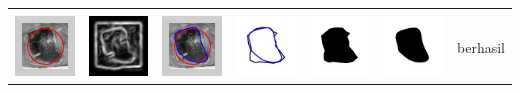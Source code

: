 \begin{table}[H]
\begin{tabular}{|m{0.7in}|m{0.7in}|m{0.7in}|m{0.7in}|m{0.7in}|m{0.7in}|m{0.7in}|}
		&  &  & & & &  \\
		\includegraphics[width=0.7in]{dataset/dataset_3/luka_hitam/ready/18_interp_init.jpg}&
		\includegraphics[width=0.7in]{dataset/dataset_3/luka_hitam/ready/18_interp_ext.jpg}&
		\includegraphics[width=0.7in]{dataset/dataset_3/luka_hitam/ready/18_interp_result.jpg}&
		\includegraphics[width=0.7in]{dataset/dataset_3/luka_hitam/ready/18_gt_r.jpg}&
		\includegraphics[width=0.7in]{dataset/dataset_3/luka_hitam/ready/18_r.jpg}&
		\includegraphics[width=0.7in]{dataset/dataset_3/luka_hitam/ready/18_interp_r.jpg}&
		berhasil\\
		\hline
		

\end{tabular}
\end{table}
